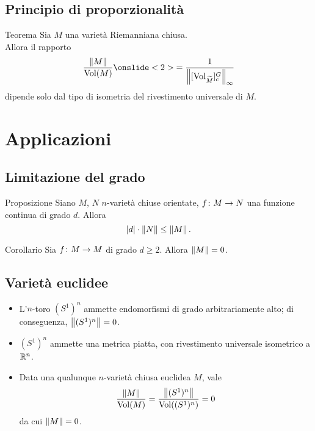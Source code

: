 \documentclass{beamer}
\begin{document}
\subsection{Principio di proporzionalità}
\begin{frame}{\secname}{\subsecname}
\begin{block}{Teorema}
Sia $M$ una varietà Riemanniana chiusa.\\
Allora il rapporto
\[
\frac{\norm{M}}{\Vol(M)}\onslide<2>{=\frac{1}{\norm{[\Vol_{\widetilde M}]^G_c}_\infty}}
\]
dipende solo dal tipo di isometria del rivestimento universale di $M$.
\end{block}
\end{frame}

\section{Applicazioni}
\subsection{Limitazione del grado}
\begin{frame}{\secname}{\subsecname}
\begin{block}{Proposizione}
Siano $M$, $N$ $n$-varietà chiuse orientate, $\map{f}{M}{N}$ una funzione continua di grado $d$. Allora
\[
|d|\cdot\left\lVert N\right\rVert\le\left\lVert M\right\rVert.
\]
\end{block}
\begin{block}{Corollario}
Sia $\map{f}{M}{M}$ di grado $d\ge 2$. Allora $\left\lVert M\right\rVert=0$.
\end{block}
\end{frame}
\subsection{Varietà euclidee}
\begin{frame}{\secname}{\subsecname}
\begin{itemize}
\item L'$n$-toro $(S^1)^n$ ammette endomorfismi di grado arbitrariamente alto; di conseguenza, $\left\lVert (S^1)^n\right\rVert=0$.
\item $(S^1)^n$ ammette una metrica piatta, con rivestimento universale isometrico a $\mathbb{R}^n$.
\item Data una qualunque $n$-varietà chiusa euclidea $M$, vale
\[
\frac{\left\lVert M\right\rVert}{\operatorname{Vol}(M)}=\frac{\left\lVert (S^1)^n\right\rVert}{\operatorname{Vol}((S^1)^n)}=0
\]
da cui $\left\lVert M\right\rVert=0$.
\end{itemize}
\end{frame}
\end{document}
